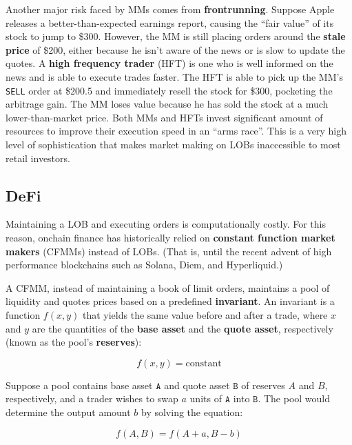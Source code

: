 \documentclass{article}
\begin{document}
Another major risk faced by MMs comes from \textbf{frontrunning}. Suppose Apple releases a better-than-expected earnings report, causing the ``fair value'' of its stock to jump to \$300. However, the MM is still placing orders around the \textbf{stale price} of \$200, either because he isn't aware of the news or is slow to update the quotes. A \textbf{high frequency trader} (HFT) is one who is well informed on the news and is able to execute trades faster. The HFT is able to pick up the MM's \texttt{SELL} order at \$200.5 and immediately resell the stock for \$300, pocketing the arbitrage gain. The MM loses value because he has sold the stock at a much lower-than-market price. Both MMs and HFTs invest significant amount of resources to improve their execution speed in an ``arms race''.\supercite{frequentbatchauctions} This is a very high level of sophistication that makes market making on LOBs inaccessible to most retail investors.

\subsection{DeFi}

Maintaining a LOB and executing orders is computationally costly. For this reason, onchain finance has historically relied on \textbf{constant function market makers} (CFMMs) instead of LOBs. (That is, until the recent advent of high performance blockchains such as Solana, Diem, and Hyperliquid.)

A CFMM, instead of maintaining a book of limit orders, maintains a pool of liquidity and quotes prices based on a predefined \textbf{invariant}. An invariant is a function $f(x, y)$ that yields the same value before and after a trade, where $x$ and $y$ are the quantities of the \textbf{base asset} and the \textbf{quote asset}, respectively (known as the pool's \textbf{reserves}):

\begin{equation}
  f(x, y) = \mathrm{constant}
\end{equation}

Suppose a pool contains base asset $\mathtt{A}$ and quote asset $\mathtt{B}$ of reserves $A$ and $B$, respectively, and a trader wishes to swap $a$ units of $\mathtt{A}$ into $\mathtt{B}$. The pool would determine the output amount $b$ by solving the equation:

\begin{equation}
  f(A, B) = f(A + a, B - b)
\end{equation}
\end{document}
